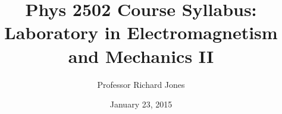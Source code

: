 \documentclass{revtex4}
\begin{document}

\title{Phys 2502 Course Syllabus: Laboratory in Electromagnetism and Mechanics II}


\author{Professor Richard Jones}


\date{January 23, 2015}


\setlength{\topmargin}{0in}

\maketitle

\end{document}
